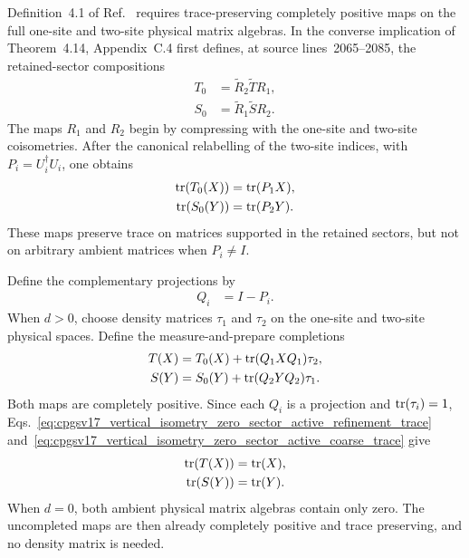 \documentclass{article}
\begin{document}
Definition~4.1 of Ref.~\cite{Cirac2016MPDO_arXiv} requires trace-preserving
completely positive maps on the full one-site and two-site physical matrix
algebras. In the converse implication of Theorem~4.14, Appendix~C.4 first
defines, at source lines~2065--2085, the retained-sector compositions
\begin{align}
    T_0
        &=\widetilde R_2\widetilde T R_1,
    \label{eq:cpgsv17_vertical_isometry_zero_sector_active_refinement_composite}\\
    S_0
        &=\widetilde R_1\widetilde S R_2.
    \label{eq:cpgsv17_vertical_isometry_zero_sector_active_coarse_composite}
\end{align}
The maps $R_1$ and $R_2$ begin by compressing with the one-site and two-site
coisometries. After the canonical relabelling of the two-site indices, with
$P_i=U_i^\dagger U_i$, one obtains
\begin{align}
    \operatorname{tr}(T_0(X))
        &=\operatorname{tr}(P_1X),
    \label{eq:cpgsv17_vertical_isometry_zero_sector_active_refinement_trace}\\
    \operatorname{tr}(S_0(Y))
        &=\operatorname{tr}(P_2Y).
    \label{eq:cpgsv17_vertical_isometry_zero_sector_active_coarse_trace}
\end{align}
These maps preserve trace on matrices supported in the retained sectors, but
not on arbitrary ambient matrices when $P_i\neq I$.

Define the complementary projections by
\begin{align}
    Q_i
        &=I-P_i.
    \label{eq:cpgsv17_vertical_isometry_zero_sector_complement_projection}
\end{align}
When $d>0$, choose density matrices $\tau_1$ and $\tau_2$ on the one-site and
two-site physical spaces. Define the measure-and-prepare completions
\begin{align}
    T(X)
        &=
        T_0(X)+\operatorname{tr}(Q_1XQ_1)\tau_2,
    \label{eq:cpgsv17_vertical_isometry_zero_sector_completed_refinement_channel}\\
    S(Y)
        &=
        S_0(Y)+\operatorname{tr}(Q_2YQ_2)\tau_1.
    \label{eq:cpgsv17_vertical_isometry_zero_sector_completed_coarse_channel}
\end{align}
Both maps are completely positive. Since each $Q_i$ is a projection and
$\operatorname{tr}(\tau_i)=1$,
Eqs.~\ref{eq:cpgsv17_vertical_isometry_zero_sector_active_refinement_trace}
and~\ref{eq:cpgsv17_vertical_isometry_zero_sector_active_coarse_trace} give
\begin{align}
    \operatorname{tr}(T(X))
        &=\operatorname{tr}(X),
    \label{eq:cpgsv17_vertical_isometry_zero_sector_completed_refinement_trace}\\
    \operatorname{tr}(S(Y))
        &=\operatorname{tr}(Y).
    \label{eq:cpgsv17_vertical_isometry_zero_sector_completed_coarse_trace}
\end{align}
When $d=0$, both ambient physical matrix algebras contain only zero. The
uncompleted maps are then already completely positive and trace preserving,
and no density matrix is needed.
\end{document}
